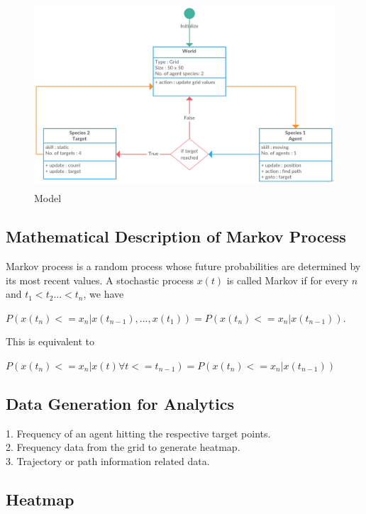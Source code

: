 \documentclass[11pt]{report}
\begin{document}
\begin{figure}[h!]
  \centering
  \includegraphics[height = 7cm, width = 14cm]{Simple_Grid_Move.png}
  \caption{Model}
  \label{fig:Model}
\end{figure}

\subsection{Mathematical Description of Markov Process}
Markov process is a  random process whose future probabilities are determined by its most recent values. A stochastic process $x(t)$ is called Markov if for every $n$ and $t_1<t_2...<t_n$, we have \\
\begin{center}
$ P(x(t_n)<=x_n|x(t_{n-1}),...,x(t_1)) = P(x(t_n)<=x_n|x(t_{n-1})) $.
\end{center}
This is equivalent to \\
\begin{center}
$ P(x(t_n)<=x_n|x(t) \forall t<=t_{n-1}) = P(x(t_n)<=x_n|x(t_{n-1})) $
\end{center}
 

\subsection{Data Generation for Analytics}
1. Frequency of an agent hitting the respective target points.\\
2. Frequency data from the grid to generate heatmap.\\
3. Trajectory or path information related data.
\subsection{Heatmap}
\end{document}
